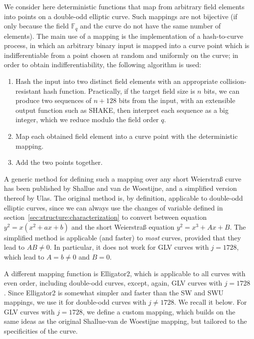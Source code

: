 \documentclass{llncs}
\newcommand{\bF}{\mathbb{F}}
\begin{document}
We consider here deterministic functions that map from arbitrary field
elements into points on a double-odd elliptic curve. Such mappings are
not bijective (if only because the field $\bF_q$ and the curve do not
have the same number of elements). The main use of a mapping is the
implementation of a hash-to-curve process, in which an arbitrary binary
input is mapped into a curve point which is indifferentiable from a
point chosen at random and uniformly on the curve; in order to obtain
indifferentiability, the following algorithm is used:
\begin{enumerate}

    \item Hash the input into two distinct field elements with an
    appropriate collision-resistant hash function. Practically, if
    the target field size is $n$ bits, we can produce two sequences
    of $n+128$ bits from the input, with an extensible output function
    such as SHAKE\cite{Fips202}, then interpret each sequence as a
    big integer, which we reduce modulo the field order $q$.

    \item Map each obtained field element into a curve point with the
    deterministic mapping.

    \item Add the two points together.

\end{enumerate}

A generic method for defining such a mapping over any short Weierstraß
curve has been published by Shallue and van de
Woestijne\cite{ShaWoe2006}, and a simplified version thereof by
Ulas\cite{Ula2007}. The original method is, by definition, applicable to
double-odd elliptic curves, since we can always use the changes of
variable defined in section~\ref{sec:structure:characterization} to
convert between equation $y^2 = x(x^2 + ax + b)$ and the short
Weierstraß equation $y^2 = x^3 + Ax + B$. The simplified method is
applicable (and faster) to \emph{most} curves, provided that they lead
to $AB \neq 0$. In particular, it does not work for GLV curves with $j =
1728$, which lead to $A = b \neq 0$ and $B = 0$.

A different mapping function is Elligator2\cite{BerHamKraLan2013}, which
is applicable to all curves with even order, including double-odd
curves, except, again, GLV curves with $j = 1728$. Since Elligator2 is
somewhat simpler and faster than the SW and SWU mappings, we use it for
double-odd curves with $j\neq 1728$. We recall it below. For GLV curves
with $j = 1728$, we define a custom mapping, which builds on the same
ideas as the original Shallue-van de Woestijne mapping, but tailored to
the specificities of the curve.
\end{document}
